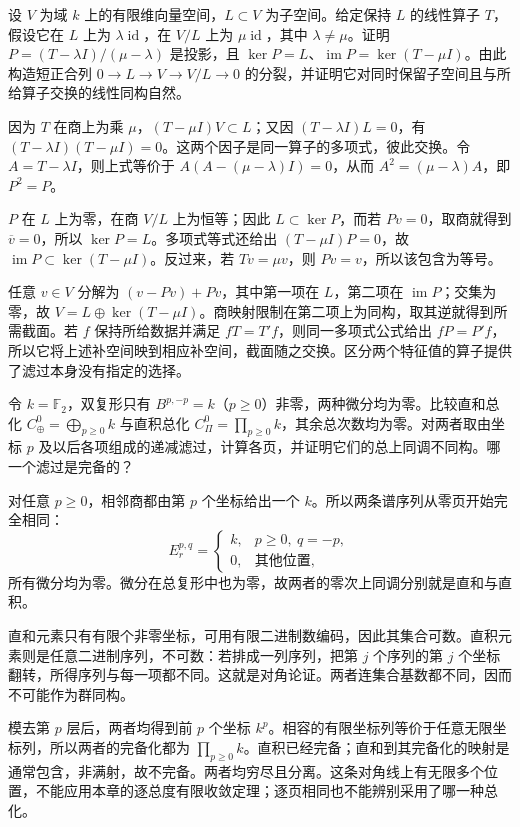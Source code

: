 \begin{exercise}\label{g2:ex:operator-selects-splitting}
	设 \(V\) 为域 \(k\) 上的有限维向量空间，\(L\subset V\) 为子空间。给定保持 \(L\) 的线性算子 \(T\)，假设它在 \(L\) 上为 \(\lambda\operatorname{id}\)，在 \(V/L\) 上为 \(\mu\operatorname{id}\)，其中 \(\lambda\ne\mu\)。证明 \(P=(T-\lambda I)/(\mu-\lambda)\) 是投影，且 \(\ker P=L\)、\(\operatorname{im}P=\ker(T-\mu I)\)。由此构造短正合列 \(0\to L\to V\to V/L\to0\) 的分裂，并证明它对同时保留子空间且与所给算子交换的线性同构自然。
\end{exercise}
\begin{solution}
	因为 \(T\) 在商上为乘 \(\mu\)，\((T-\mu I)V\subset L\)；又因 \((T-\lambda I)L=0\)，有 \((T-\lambda I)(T-\mu I)=0\)。这两个因子是同一算子的多项式，彼此交换。令 \(A=T-\lambda I\)，则上式等价于 \(A(A-(\mu-\lambda)I)=0\)，从而 \(A^2=(\mu-\lambda)A\)，即 \(P^2=P\)。

	\(P\) 在 \(L\) 上为零，在商 \(V/L\) 上为恒等；因此 \(L\subset\ker P\)，而若 \(Pv=0\)，取商就得到 \(\overline v=0\)，所以 \(\ker P=L\)。多项式等式还给出 \((T-\mu I)P=0\)，故 \(\operatorname{im}P\subset\ker(T-\mu I)\)。反过来，若 \(Tv=\mu v\)，则 \(Pv=v\)，所以该包含为等号。

	任意 \(v\in V\) 分解为 \((v-Pv)+Pv\)，其中第一项在 \(L\)，第二项在 \(\operatorname{im}P\)；交集为零，故 \(V=L\oplus\ker(T-\mu I)\)。商映射限制在第二项上为同构，取其逆就得到所需截面。若 \(f\) 保持所给数据并满足 \(fT=T'f\)，则同一多项式公式给出 \(fP=P'f\)，所以它将上述补空间映到相应补空间，截面随之交换。区分两个特征值的算子提供了滤过本身没有指定的选择。
\end{solution}

\begin{exercise}\label{g2:ex:sum-product-totalizations}
	令 \(k=\mathbb F_2\)，双复形只有 \(B^{p,-p}=k\)（\(p\ge0\)）非零，两种微分均为零。比较直和总化 \(C^0_{\oplus}=\bigoplus_{p\ge0}k\) 与直积总化 \(C^0_{\Pi}=\prod_{p\ge0}k\)，其余总次数均为零。对两者取由坐标 \(p\) 及以后各项组成的递减滤过，计算各页，并证明它们的总上同调不同构。哪一个滤过是完备的？
\end{exercise}
\begin{solution}
	对任意 \(p\ge0\)，相邻商都由第 \(p\) 个坐标给出一个 \(k\)。所以两条谱序列从零页开始完全相同：
	\[
		E_r^{p,q}=\begin{cases}k,&p\ge0,\ q=-p,\\0,&\text{其他位置},\end{cases}
	\]
	所有微分均为零。微分在总复形中也为零，故两者的零次上同调分别就是直和与直积。

	直和元素只有有限个非零坐标，可用有限二进制数编码，因此其集合可数。直积元素则是任意二进制序列，不可数：若排成一列序列，把第 \(j\) 个序列的第 \(j\) 个坐标翻转，所得序列与每一项都不同。这就是对角论证。两者连集合基数都不同，因而不可能作为群同构。

	模去第 \(p\) 层后，两者均得到前 \(p\) 个坐标 \(k^p\)。相容的有限坐标列等价于任意无限坐标列，所以两者的完备化都为 \(\prod_{p\ge0}k\)。直积已经完备；直和到其完备化的映射是通常包含，非满射，故不完备。两者均穷尽且分离。这条对角线上有无限多个位置，不能应用本章的逐总度有限收敛定理；逐页相同也不能辨别采用了哪一种总化。
\end{solution}

